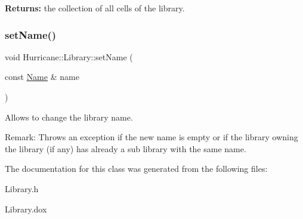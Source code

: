 {\bfseries Returns\+:} the collection of all cells of the library. \mbox{\label{classHurricane_1_1Library_a1181e4e87f42749bdfda253cad658ea9}} 
\subsubsection{\texorpdfstring{set\+Name()}{setName()}}
{\footnotesize\ttfamily void Hurricane\+::\+Library\+::set\+Name (\begin{DoxyParamCaption}\item[{const \mbox{\hyperlink{classHurricane_1_1Name}{Name}} \&}]{name }\end{DoxyParamCaption})}

Allows to change the library name.

\begin{DoxyParagraph}{Remark\+: Throws an exception if the new name is empty or if the }
library owning the library (if any) has already a sub library with the same name. 
\end{DoxyParagraph}


The documentation for this class was generated from the following files\+:\begin{DoxyCompactItemize}
\item 
Library.\+h\item 
Library.\+dox\end{DoxyCompactItemize}
